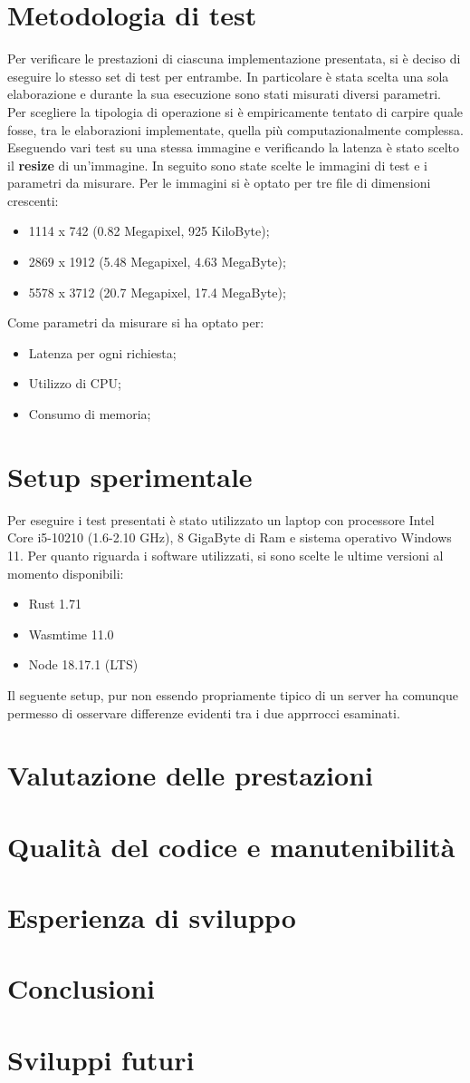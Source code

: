 \section{Metodologia di test}
Per verificare le prestazioni di ciascuna implementazione presentata, si è deciso di eseguire lo stesso set di test per entrambe.
In particolare è stata scelta una sola elaborazione e durante la sua esecuzione sono stati misurati diversi parametri.
Per scegliere la tipologia di operazione si è empiricamente tentato di carpire quale fosse, tra le elaborazioni implementate, quella più computazionalmente complessa.
Eseguendo vari test su una stessa immagine e verificando la latenza è stato scelto il \textbf{resize} di un'immagine.
In seguito sono state scelte le immagini di test e i parametri da misurare.
Per le immagini si è optato per tre file di dimensioni crescenti:
\begin{itemize}
    \item 1114 x 742 (0.82 Megapixel, 925 KiloByte);
    \item 2869 x 1912 (5.48 Megapixel, 4.63 MegaByte);
    \item 5578 x 3712 (20.7 Megapixel, 17.4 MegaByte);
\end{itemize}
Come parametri da misurare si ha optato per:
\begin{itemize}
    \item Latenza per ogni richiesta;
    \item Utilizzo di CPU;
    \item Consumo di memoria;
\end{itemize}
\section{Setup sperimentale}
Per eseguire i test presentati è stato utilizzato un laptop con processore Intel Core i5-10210 (1.6-2.10 GHz), 8 GigaByte di Ram e sistema operativo Windows 11.
Per quanto riguarda i software utilizzati, si sono scelte le ultime versioni al momento disponibili:
\begin{itemize}
    \item Rust 1.71
    \item Wasmtime 11.0
    \item Node 18.17.1 (LTS)
\end{itemize}
Il seguente setup, pur non essendo propriamente tipico di un server ha comunque permesso di osservare differenze evidenti tra i due apprrocci esaminati.
\section{Valutazione delle prestazioni}
\section{Qualità del codice e manutenibilità}
\section{Esperienza di sviluppo}
\section{Conclusioni}
\section{Sviluppi futuri}
\begin{lstlisting}[language=Javascript, showstringspaces=false]
\end{lstlisting}